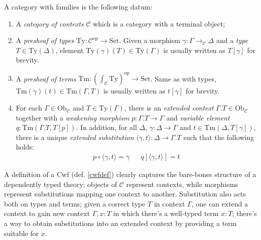 \begin{definition}\label{cwfdef}
A category with families is the following datum:
\begin{enumerate}
    \item A \textit{category of contexts} $\mathcal{C}$
        which is a category with a terminal object;
    \item A \textit{presheaf of types} $\mathrm{Ty}:
        \mathcal{C}^\mathrm{op}\to\mathrm{Set}$. Given a
        morphism $\gamma: \Gamma\to_\mathcal{C}\Delta$
        and a \textit{type} $T\in\mathrm{Ty}(\Delta)$,
        element $\mathrm{Ty}(\gamma)(T)\in
        \mathrm{Ty}(\Gamma)$ is usually written as
        $T[\gamma]$ for brevity.
    \item A \textit{presheaf of terms} $\mathrm{Tm}:
        \left(\int_\mathcal{C}\mathrm{Ty}\right
        )^\mathrm{op}\to\mathrm{Set}$. Same as with
        types, $\mathrm{Tm}(\gamma)(t)\in\mathrm{Tm}
        (\Gamma, T)$ is usually written as $t[\gamma]$
        for brevity.
    \item For each $\Gamma\in\mathrm{Ob}_\mathcal{C}$
        and $T\in\mathrm{Ty}(\Gamma)$, there is an
        \textit{extended context}
        $\Gamma.T\in\mathrm{Ob}_\mathcal{C}$ together
        with a \textit{weakening morphism}
        $p:\Gamma.T\to\Gamma$ and \textit{variable
        element} $q:\mathrm{Tm}(\Gamma.T, T[p])$. In
        addition, for all $\Delta$,
        $\gamma:\Delta\to\Gamma$ and
        $t\in\mathrm{Tm}(\Delta, T[\gamma])$, there is a
        unique \textit{extended substitution}
        $\langle\gamma,t\rangle:\Delta\to\Gamma.T$ such
        that the following holds:
        \begin{align*}
            p\circ\langle\gamma,t\rangle=\gamma & &
            q[\langle \gamma, t \rangle] = t
        \end{align*}
\end{enumerate}
\end{definition}

A definition of a Cwf (def. \ref{cwfdef}) clearly
captures the bare-bones structure of a dependently
typed theory: objects of $\mathcal{C}$ represent
contexts, while morphisms represent substitutions
mapping one context to another. Substitution also acts
both on types and terms; given a correct type $T$ in
context $\Gamma$, one can extend a context to gain new
context $\Gamma,x:T$ in which there's a well-typed term
$x:T$; there's a way to obtain substitutions into an
extended context by providing a term suitable for $x$.

